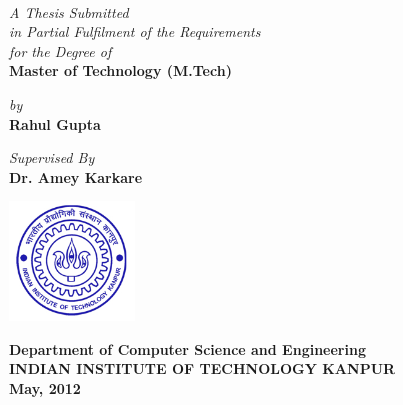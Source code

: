 \titlepage
\thispagestyle{empty}
\begin{center}
\\
\end{center}\vspace{15mm}
\begin{center}
{\it{A Thesis Submitted}}\\
{\it{in Partial Fulfilment of the Requirements}}\\
{\it{for the Degree of}}\\

{\bf {\large Master of Technology (M.Tech)}}\\
\vspace{20mm}

{\it{by}} \\
{\bf{\large Rahul Gupta}}\\

\vspace{1cm}

{\it{Supervised By}} \\
{\large \bf {Dr. Amey Karkare}}\\

\end{center}
\vspace{10mm}
\begin{center}
\includegraphics[width=0.25\textwidth]{diagrams/iitklogo}
\end{center}
\begin{center}
\vspace{3mm}
{\bf {\large {\sc Department of Computer Science and Engineering}}}\\
\vspace{2mm}
{\bf {\large INDIAN INSTITUTE OF TECHNOLOGY KANPUR}}\\
\vspace{3mm}
{\textbf{ May, 2012}}\\
\end{center}

